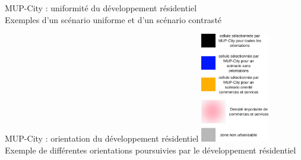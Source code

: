 \documentclass[xcolor=table]{beamer}
\begin{document}

\begin{frame}{MUP-City : uniformité du développement résidentiel}
\vspace{1cm}
\\
{\footnotesize Exemples d'un scénario uniforme et d'un scénario contrasté}
\end{frame}


\begin{frame}{MUP-City : orientation du développement résidentiel}
\vspace{1cm}
\hspace*{-0.5cm}
\includegraphics[width=3cm]{Images/legendAHP.png}
\\
{\footnotesize Exemple de différentes orientations poursuivies par le développement résidentiel}
\end{frame}
\end{document}
